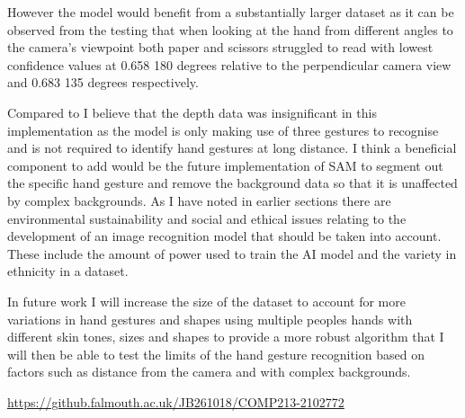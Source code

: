 \documentclass[conference]{IEEEtran}
\begin{document}
However the model would benefit from a substantially larger dataset as it can be observed from the testing that when looking at the hand from different angles to the camera's viewpoint both paper and scissors struggled to read with lowest confidence values at 0.658 180 degrees relative to the perpendicular camera view and 0.683 135 degrees respectively. 

Compared to \cite{segmentationRCNN:2018} I believe that the depth data was insignificant in this implementation as the model is only making use of three gestures to recognise and is not required to identify hand gestures at long distance.
I think a beneficial component to add would be the future implementation of SAM \cite{SAM:2023} to segment out the specific hand gesture and remove the background data so that it is unaffected by complex backgrounds.
As I have noted in earlier sections there are environmental sustainability and social and ethical issues relating to the development of an image recognition model that should be taken into account. These include the amount of power used to train the AI model and the variety in ethnicity in a dataset.

In future work I will increase the size of the dataset to account for more variations in hand gestures and shapes using multiple peoples hands with different skin tones, sizes and shapes to provide a more robust algorithm that I will then be able to test the limits of the hand gesture recognition based on factors such as distance from the camera and with complex backgrounds.





\nocite{*} %
\small{
\vspace{0.75in}}

\url{https://github.falmouth.ac.uk/JB261018/COMP213-2102772}


\vspace{12pt}
\end{document}
